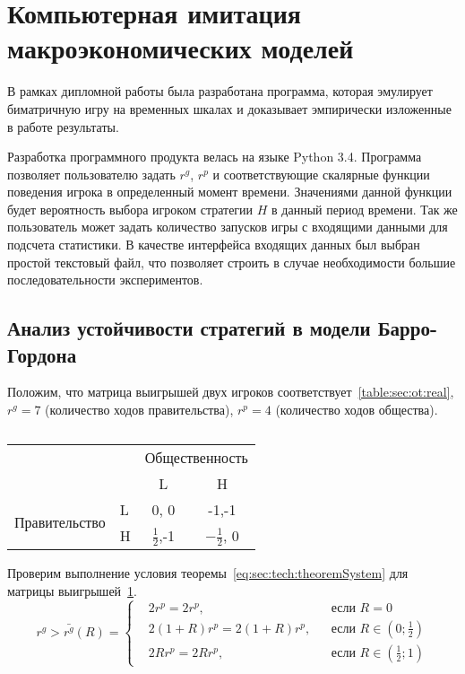 \section{Компьютерная имитация макроэкономических моделей} 

В рамках дипломной работы была разработана программа, которая эмулирует
биматричную игру на временных шкалах и доказывает эмпирически изложенные в
работе результаты.  

Разработка программного продукта велась на языке Python 3.4.
Программа позволяет пользователю задать $r^g$, $r^p$ и соответствующие
скалярные функции поведения игрока в определенный момент времени. Значениями
данной функции будет вероятность выбора игроком  стратегии $H$ в данный период
времени. Так же пользователь может задать количество запусков игры с входящими
данными для подсчета статистики. В качестве интерфейса входящих данных был
выбран простой текстовый файл, что позволяет строить в случае необходимости 
большие последовательности экспериментов.

\subsection{Анализ устойчивости стратегий в модели Барро-Гордона}
Положим, что матрица выигрышей двух игроков соответствует~\ref{table:sec:ot:real},
$r^g= 7$ (количество ходов правительства), $r^p= 4$ (количество ходов общества).

\begin{table}[h]
	\centering
	
	\caption{}	
\begin{tabular}{|l|l|c|c|}
	\hline
	\multicolumn{2}{|l|}{\multirow{2}{*}{}} & \multicolumn{2}{l|}{Общественность} \\ \cline{3-4} 
	\multicolumn{2}{|l|}{}                  & L                & H                \\ \hline
	\multirow{2}{*}{Правительство}    & L   & 0, 0             & -1,-1            \\ \cline{2-4} 
	& H   & $\frac{1}{2}$,-1             & $-\frac{1}{2}$, 0            \\ \hline
\end{tabular}

	\label{table:sec:ot:real1}
\end{table}

Проверим выполнение условия теоремы~\ref{eq:sec:tech:theoremSystem} для матрицы выигрышей~\ref{table:sec:ot:real1}. 
$$
r^g> \bar{r^g}(R) = \left\{ 
\begin{aligned} 
&2r^p= 2r^p, &&\text{если } R=0
\\
&2(1+R)r^p= 2(1+R)r^p, &&\text{если } 	R\in\left(0; \frac{1}{2}\right)
\\
&2Rr^p= 2Rr^p, &&\text{если } 	R\in\left( \frac{1}{2};1\right)
\end{aligned}
\right.		
$$

